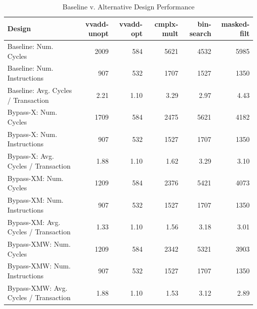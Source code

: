 \documentclass[10pt]{article}
\begin{document}
\begin{center}
\begin{table}[h]
\begin{tabular} {|l | r | r | r | r | r |}

\hline
\textbf{Design}    & \textbf{vvadd-unopt} & \textbf{vvadd-opt} & \textbf{cmplx-mult} & \textbf{bin-search} & \textbf{masked-filt} \\
\hline
Baseline:    Num. Cycles                 &    2009    &   584    &   5621   &  4532	&	5985					\\
Baseline: 	 Num. Instructions           &      907      &   532    &   1707   & 1527 &	1350					\\
Baseline:    Avg. Cycles / Transaction    &    2.21    &  1.10     &  3.29    & 2.97	&	4.43					\\

Bypass-X: Num. Cycles                 &    1709    &   584    &  2475    & 5621	&		4182				\\
Bypass-X: Num. Instructions           &      907      &    532   &   1527   & 1707 &		1350				\\
Bypass-X: Avg. Cycles / Transaction    &     1.88   &    1.10   &   1.62   & 3.29	&	3.10				    \\

Bypass-XM: Num. Cycles                 &    1209    &   584    &  2376    & 5421	&		4073				\\
Bypass-XM: Num. Instructions           &      907      &    532   &   1527   & 1707 &		1350				\\
Bypass-XM: Avg. Cycles / Transaction    &     1.33   &    1.10   &   1.56   & 3.18	&	3.01				    \\

Bypass-XMW: Num. Cycles                 &    1209    &   584    &  2342    & 5321	&		3903				\\
Bypass-XMW: Num. Instructions           &      907      &    532   &   1527   & 1707 &		1350				\\
Bypass-XMW: Avg. Cycles / Transaction    &     1.88   &    1.10   &   1.53   & 3.12	&	2.89				    \\
\hline                    
\end{tabular}
\caption{Baseline v. Alternative Design Performance}
\label{tab:cycles}
\end{table}
\end{center}



\end{document}
